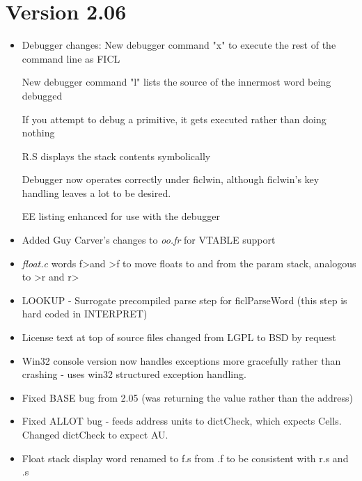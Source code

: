 \section*{Version 2.06}
\begin{itemize}[noitemsep]
	\item Debugger changes:
		\subitem New debugger command "x" to execute the rest
		of the command line as FICL

		\subitem New debugger command "l" lists the source of
		the innermost word being debugged

		\subitem If you attempt to debug a primitive, it gets
		executed rather than doing nothing

		\subitem R.S displays the stack contents symbolically

		\subitem Debugger now operates correctly under ficlwin,
		although ficlwin's key handling leaves a lot to be
		desired.

		\subitem EE listing enhanced for use with the debugger

	\item Added Guy Carver's changes to \textit{oo.fr} for VTABLE
	support

	\item \textit{float.c} words f\textgreater  and \textgreater f
	to move floats to and from the param stack, analogous
	to \textgreater r and r\textgreater

	\item LOOKUP - Surrogate precompiled parse step for
	ficlParseWord (this step is hard coded in INTERPRET)

	\item License text at top of source files changed from LGPL to
	BSD by request

	\item Win32 console version now handles exceptions more
	gracefully rather than crashing - uses win32 structured
	exception handling.

	\item Fixed BASE bug from 2.05 (was returning the value rather
	than the address)

	\item Fixed ALLOT bug - feeds address units to dictCheck, which
	expects Cells. Changed dictCheck to expect AU.

	\item Float stack display word renamed to f.s from .f to be
	consistent with r.s and .s
\end{itemize}


